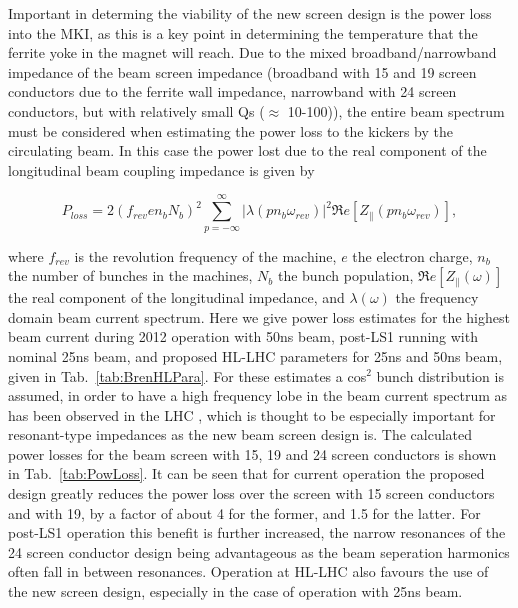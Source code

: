 \documentclass{JAC2003}
\begin{document}
Important in determing the viability of the new screen design is the power loss into the MKI, as this is a key point in determining the temperature that the ferrite yoke in the magnet will reach. Due to the mixed broadband/narrowband impedance of the beam screen impedance (broadband with 15 and 19 screen conductors due to the ferrite wall impedance, narrowband with 24 screen conductors, but with relatively small Qs ($\approx$ 10-100)), the entire beam spectrum must be considered when estimating the power loss to the kickers by the circulating beam. In this case the power lost due to the real component of the longitudinal beam coupling impedance is given by 

\begin{equation}
P_{loss} = 2 \left( f_{rev} e n_{b}  N_{b}\right)^{2} \displaystyle\sum\limits_{p = -\infty}^{\infty}  \left| \lambda \left( p n_{b} \omega_{rev} \right)  \right|^{2} \Re{}e \left[ Z_{\parallel} \left( p n_{b}\omega_{rev} \right) \right],
\label{eqn:heating-gen}
\end{equation} 

where $f_{rev}$ is the revolution frequency of the machine, $e$ the electron charge, $n_{b}$ the number of bunches in the machines, $N_{b}$ the bunch population, $\Re{}e[Z_{\parallel}(\omega )]$ the real component of the longitudinal impedance, and $\lambda (\omega )$ the frequency domain beam current spectrum. Here we give power loss estimates for the highest beam current during 2012 operation with 50ns beam, post-LS1 running with nominal 25ns beam, and proposed HL-LHC parameters for 25ns and 50ns beam, given in Tab.~\ref{tab:BrenHLPara}. For these estimates a cos$^{2}$ bunch distribution is assumed, in order to have a high frequency lobe in the beam current spectrum as has been observed in the LHC \cite{LHCRF}, which is thought to be especially important for resonant-type impedances as the new beam screen design is. The calculated power losses for the beam screen with 15, 19 and 24 screen conductors is shown in Tab.~\ref{tab:PowLoss}. It can be seen that for current operation the proposed design greatly reduces the power loss over the screen with 15 screen conductors and with 19, by a factor of about 4 for the former, and 1.5 for the latter. For post-LS1 operation this benefit is further increased, the narrow resonances of the 24 screen conductor design being advantageous as the beam seperation harmonics often fall in between resonances. Operation at HL-LHC also favours the use of the new screen design, especially in the case of operation with 25ns beam.
\end{document}
